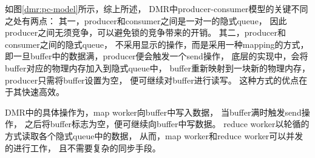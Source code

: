 如图\ref{dmr:pc-model}所示，综上所述，
DMR中producer-consumer模型的关键不同之处有两点：
其一，producer和consumer之间是一对一的隐式queue，
因此producer之间无须竞争，可以避免锁的竞争带来的开销。
其二，producer和consumer之间的隐式queue，
不采用显示的操作，而是采用一种mapping的方式，
即一旦buffer中的数据满，producer便会触发一个send操作，
底层的实现中，会将buffer对应的物理内存加入到隐式queue中，
buffer重新映射到一块新的物理内存，
producer只需将buffer设置为空，
便可继续对buffer进行读写。
这种方式的优点在于其快速高效。

DMR中的具体操作为，map worker向buffer中写入数据，
当buffer满时触发send操作，
之后将buffer标志为空，便可继续向buffer中写数据。
reduce worker以轮循的方式读取各个隐式queue中的数据，
从而，map worker和reduce worker可以并发的进行工作，
且不需要复杂的同步手段。

